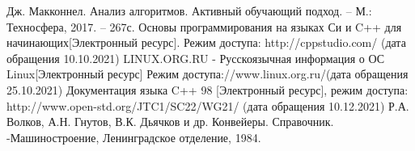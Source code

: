 \documentclass[12pt,a4paper]{report}
\begin{document}
	
	\newpage
	\renewcommand\bibname{Список литературы}
	\makeatletter %
	\def\@biblabel#1{#1. }
	\makeatother
	\begin{thebibliography}{2}
		 Дж. Макконнел. Анализ алгоритмов. Активный обучающий подход. -- М.: Техносфера, 2017. -- 267с.
		Основы программирования на языках Си и C++ для начинающих[Электронный ресурс]. Режим доступа: http://cppstudio.com/ (дата обращения 10.10.2021)
		LINUX.ORG.RU - Русскоязычная информация о ОС Linux[Электронный ресурс] Режим доступа://www.linux.org.ru/(дата обращения 25.10.2021)
		  Документация языка C++ 98 [Электронный ресурс], режим доступа: http://www.open-std.org/JTC1/SC22/WG21/ (дата обращения 10.12.2021)
		\bibitem{} Р.А. Волков, А.Н. Гнутов, В.К. Дьячков и др. Конвейеры. Справочник. -Машиностроение, Ленинградское отделение, 1984.
		
	\end{thebibliography}
	
\end{document}
